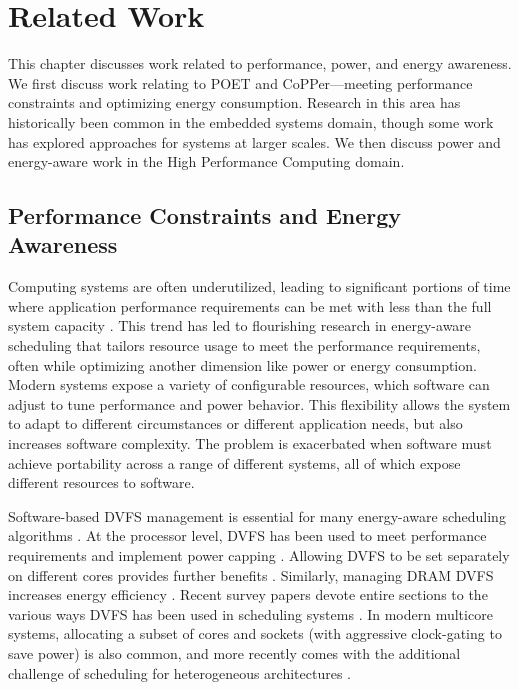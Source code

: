 \chapter{Related Work}
\label{sec:related}

This chapter discusses work related to performance, power, and energy awareness.
We first discuss work relating to POET and CoPPer---meeting performance constraints and optimizing energy consumption.
Research in this area has historically been common in the embedded systems domain, though some work has explored approaches for systems at larger scales.
We then discuss power and energy-aware work in the High Performance Computing domain.


\section{Performance Constraints and Energy Awareness}

Computing systems are often underutilized, leading to significant portions of time where application performance requirements can be met with less than the full system capacity \cite{google,MeisnerISCA2011}.
This trend has led to flourishing research in energy-aware scheduling that tailors resource usage to meet the performance requirements, often while optimizing another dimension like power or energy consumption.
Modern systems expose a variety of configurable resources, which software can adjust to tune performance and power behavior.
This flexibility allows the system to adapt to different circumstances or different application needs, but also increases software complexity.
The problem is exacerbated when software must achieve portability across a range of different systems, all of which expose different resources to software.

Software-based DVFS management is essential for many energy-aware scheduling algorithms \cite{Albers,YDS}.
At the processor level, DVFS has been used to meet performance requirements \cite{Lu2002,Wu2004} and implement power capping \cite{lefurgy2008power}.
Allowing DVFS to be set separately on different cores provides further benefits \cite{Isci2006,Rangan2009}.
Similarly, managing DRAM DVFS increases energy efficiency \cite{Memscale,Diniz2007}.
Recent survey papers devote entire sections to the various ways DVFS has been used in scheduling systems \cite{ZhuralevSurvey,MittalSurvey}.
In modern multicore systems, allocating a subset of cores and sockets (with aggressive clock-gating to save power) is also common, and more recently comes with the additional challenge of scheduling for heterogeneous architectures \cite{Petrucci2012}.

